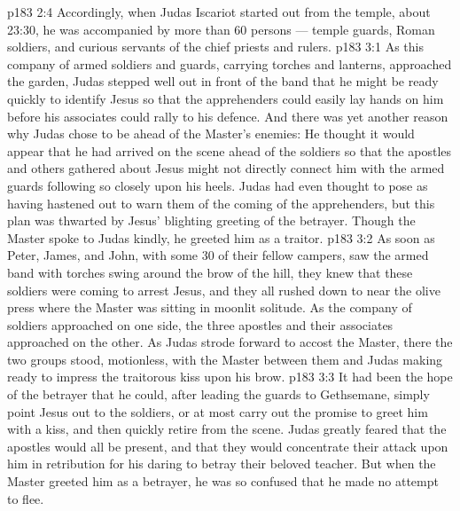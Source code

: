 \vs p183 2:4 Accordingly, when Judas Iscariot started out from the temple, about 23:30, he was accompanied by more than 60 persons --- temple guards, Roman soldiers, and curious servants of the chief priests and rulers.
\vs p183 3:1 As this company of armed soldiers and guards, carrying torches and lanterns, approached the garden, Judas stepped well out in front of the band that he might be ready quickly to identify Jesus so that the apprehenders could easily lay hands on him before his associates could rally to his defence. And there was yet another reason why Judas chose to be ahead of the Master’s enemies: He thought it would appear that he had arrived on the scene ahead of the soldiers so that the apostles and others gathered about Jesus might not directly connect him with the armed guards following so closely upon his heels. Judas had even thought to pose as having hastened out to warn them of the coming of the apprehenders, but this plan was thwarted by Jesus’ blighting greeting of the betrayer. Though the Master spoke to Judas kindly, he greeted him as a traitor.
\vs p183 3:2 As soon as Peter, James, and John, with some 30 of their fellow campers, saw the armed band with torches swing around the brow of the hill, they knew that these soldiers were coming to arrest Jesus, and they all rushed down to near the olive press where the Master was sitting in moonlit solitude. As the company of soldiers approached on one side, the three apostles and their associates approached on the other. As Judas strode forward to accost the Master, there the two groups stood, motionless, with the Master between them and Judas making ready to impress the traitorous kiss upon his brow.
\vs p183 3:3 It had been the hope of the betrayer that he could, after leading the guards to Gethsemane, simply point Jesus out to the soldiers, or at most carry out the promise to greet him with a kiss, and then quickly retire from the scene. Judas greatly feared that the apostles would all be present, and that they would concentrate their attack upon him in retribution for his daring to betray their beloved teacher. But when the Master greeted him as a betrayer, he was so confused that he made no attempt to flee.
